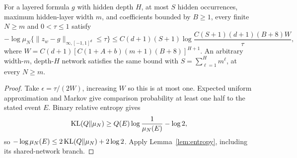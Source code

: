 \begin{theorem}
\label{thm:uniform-mass}
For a layered formula $g$ with hidden depth $H$, at most $S$ hidden occurrences, maximum hidden-layer width $m$, and coefficients bounded by $B\ge1$, every finite $N\ge m$ and $0<\tau\le1$ satisfy
\[
 -\log\mu_N\{\|z_w-g\|_{\infty,[-1,1]^d}\le\tau\}
 \le C(d+1)(S+1)\log\frac{C(S+1)(d+1)(B+8)W}{\tau},
\]
where $W=C(d+1)[C(1+A+b)(m+1)(B+8)]^{H+1}$.
An arbitrary width-$m$, depth-$H$ network satisfies the same bound with $S=\sum_{\ell=1}^H m^\ell$, at every $N\ge m$.
\end{theorem}
\begin{proof}
Take $\epsilon=\tau/(2W)$, increasing $W$ so this is at most one. Expected uniform approximation and Markov give comparison probability at least one half to the stated event $E$. Binary relative entropy gives
\[
 \operatorname{KL}(Q\|\mu_N)\ge Q(E)\log\frac1{\mu_N(E)}-\log2,
\]
so $-\log\mu_N(E)\le2\operatorname{KL}(Q\|\mu_N)+2\log2$. Apply Lemma~\ref{lem:entropy}, including its shared-network branch.
\end{proof}
